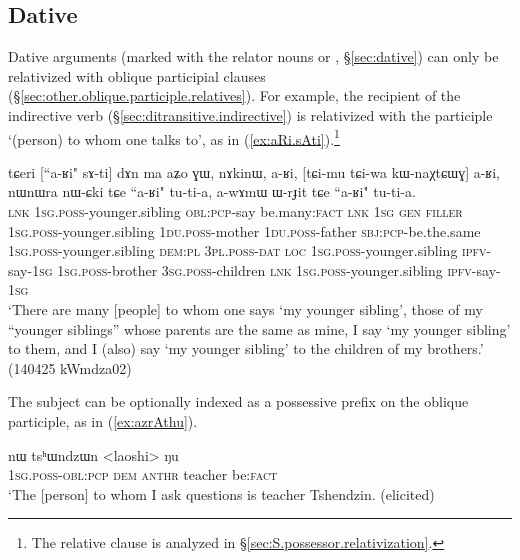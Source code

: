 \subsection{Dative} \label{sec:dative.relativization}
Dative arguments (marked with the relator nouns  or , §\ref{sec:dative}) can only be relativized with oblique participial clauses (§\ref{sec:other.oblique.participle.relatives}). For example, the recipient of the indirective verb  (§\ref{sec:ditransitive.indirective}) is relativized with the participle  `(person) to whom one talks to', as in (\ref{ex:aRi.sAti}).\footnote{The relative clause  is analyzed in §\ref{sec:S.possessor.relativization}.}

\begin{exe}
\ex \label{ex:aRi.sAti}
\gll tɕeri [``a-ʁi" sɤ-ti] dɤn ma aʑo ɣɯ, nɤkinɯ, a-ʁi, [tɕi-mu tɕi-wa kɯ-naχtɕɯɣ] a-ʁi, 
nɯnɯra nɯ-ɕki tɕe ``a-ʁi" tu-ti-a, a-wɤmɯ ɯ-rɟit tɕe ``a-ʁi" tu-ti-a. \\
\textsc{lnk} \textsc{1sg}.\textsc{poss}-younger.sibling \textsc{obl}:\textsc{pcp}-say be.many:\textsc{fact} \textsc{lnk} \textsc{1sg} \textsc{gen} \textsc{filler} \textsc{1sg}.\textsc{poss}-younger.sibling  \textsc{1du}.\textsc{poss}-mother  \textsc{1du}.\textsc{poss}-father \textsc{sbj}:\textsc{pcp}-be.the.same  \textsc{1sg}.\textsc{poss}-younger.sibling \textsc{dem}:\textsc{pl} \textsc{3pl}.\textsc{poss}-\textsc{dat} \textsc{loc}  \textsc{1sg}.\textsc{poss}-younger.sibling \textsc{ipfv}-say-\textsc{1sg} \textsc{1sg}.\textsc{poss}-brother \textsc{3sg}.\textsc{poss}-children \textsc{lnk} \textsc{1sg}.\textsc{poss}-younger.sibling \textsc{ipfv}-say-\textsc{1sg}  \\
\glt `There are many [people] to whom one says `my younger sibling', those of my ``younger siblings'' whose parents are the same as mine, I say `my younger sibling' to them, and I (also) say  `my younger sibling' to the children of my brothers.' (140425 kWmdza02)
\end{exe}

The subject can be optionally indexed as a possessive prefix on the oblique participle, as in (\ref{ex:azrAthu}).

\begin{exe}
\ex \label{ex:azrAthu}
\gll [a-z-rɤ-tʰu] nɯ tsʰɯndzɯn <laoshi> ŋu \\
\textsc{1sg}.\textsc{poss}-\textsc{obl}:\textsc{pcp} \textsc{dem}  \textsc{anthr} teacher be:\textsc{fact} \\
\glt `The [person] to whom I ask questions is teacher Tshendzin. (elicited)
\end{exe}

